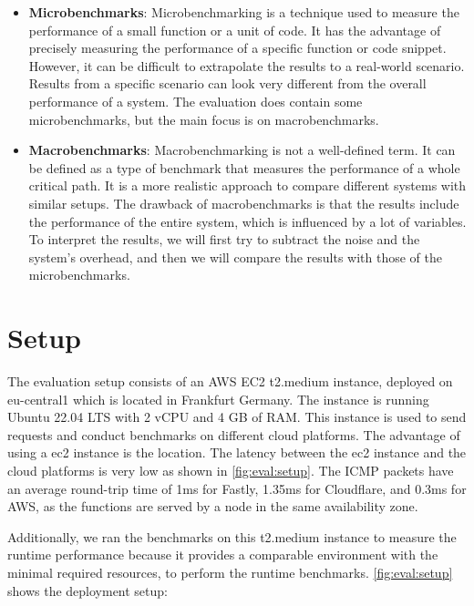 \begin{itemize}
    \item \textbf{Microbenchmarks}: Microbenchmarking is a technique used to measure the performance of a small function or a unit of code. It has the advantage of precisely measuring the performance of a specific function or code snippet. However, it can be difficult to extrapolate the results to a real-world scenario. Results from a specific scenario can look very different from the overall performance of a system. The evaluation does contain some microbenchmarks, but the main focus is on macrobenchmarks.
    \item \textbf{Macrobenchmarks}: Macrobenchmarking is not a well-defined term. It can be defined as a type of benchmark that measures the performance of a whole critical path. It is a more realistic approach to compare different systems with similar setups. The drawback of macrobenchmarks is that the results include the performance of the entire system, which is influenced by a lot of variables. To interpret the results, we will first try to subtract the noise and the system's overhead, and then we will compare the results with those of the microbenchmarks.
\end{itemize}

\section{Setup}
\label{sec:setup}

The evaluation setup consists of an AWS EC2 t2.medium instance, deployed on eu-central1 which is located in Frankfurt Germany. The instance is running Ubuntu 22.04 LTS with 2 vCPU and 4 GB of RAM. This instance is used to send requests and conduct benchmarks on different cloud platforms. The advantage of using a ec2 instance is the location. The latency between the ec2 instance and the cloud platforms is very low as shown in \autoref{fig:eval:setup}. The \gls{ICMP} packets have an average round-trip time of 1ms for Fastly, 1.35ms for Cloudflare, and 0.3ms for AWS, as the functions are served by a node in the same availability zone.

Additionally, we ran the benchmarks on this t2.medium instance to measure the runtime performance because it provides a comparable environment with the minimal required resources, to perform the runtime benchmarks. \autoref{fig:eval:setup} shows the deployment setup:

